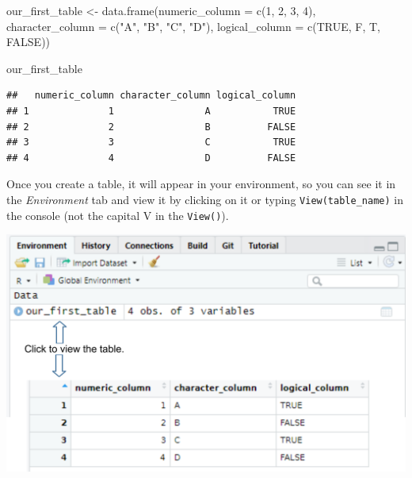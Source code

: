\documentclass[
]{book}
\newenvironment{Shaded}{\begin{snugshade}}{\end{snugshade}}
\newcommand{\AttributeTok}[1]{\textcolor[rgb]{0.77,0.63,0.00}{#1}}
\newcommand{\ConstantTok}[1]{\textcolor[rgb]{0.00,0.00,0.00}{#1}}
\newcommand{\DecValTok}[1]{\textcolor[rgb]{0.00,0.00,0.81}{#1}}
\newcommand{\FunctionTok}[1]{\textcolor[rgb]{0.00,0.00,0.00}{#1}}
\newcommand{\NormalTok}[1]{#1}
\newcommand{\OtherTok}[1]{\textcolor[rgb]{0.56,0.35,0.01}{#1}}
\newcommand{\StringTok}[1]{\textcolor[rgb]{0.31,0.60,0.02}{#1}}
\begin{document}
\begin{Shaded}
\begin{Highlighting}[]
\NormalTok{our\_first\_table }\OtherTok{\textless{}{-}} \FunctionTok{data.frame}\NormalTok{(}\AttributeTok{numeric\_column =} \FunctionTok{c}\NormalTok{(}\DecValTok{1}\NormalTok{, }\DecValTok{2}\NormalTok{, }\DecValTok{3}\NormalTok{, }\DecValTok{4}\NormalTok{), }
                              \AttributeTok{character\_column =} \FunctionTok{c}\NormalTok{(}\StringTok{"A"}\NormalTok{, }\StringTok{"B"}\NormalTok{, }\StringTok{"C"}\NormalTok{, }\StringTok{"D"}\NormalTok{),}
                              \AttributeTok{logical\_column =} \FunctionTok{c}\NormalTok{(}\ConstantTok{TRUE}\NormalTok{, F, T, }\ConstantTok{FALSE}\NormalTok{))}

\NormalTok{our\_first\_table}
\end{Highlighting}
\end{Shaded}

\begin{verbatim}
##   numeric_column character_column logical_column
## 1              1                A           TRUE
## 2              2                B          FALSE
## 3              3                C           TRUE
## 4              4                D          FALSE
\end{verbatim}

Once you create a table, it will appear in your environment, so you can see it in the \emph{Environment} tab and view it by clicking on it or typing \texttt{View(table\_name)} in the console (not the capital V in the \texttt{View()}).

\begin{center}\includegraphics[width=1\linewidth]{images/viewing-table} \end{center}
\end{document}
